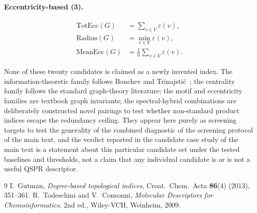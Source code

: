 \documentclass[11pt,a4paper]{article}
\begin{document}
\paragraph{Eccentricity-based (3).}
\begin{align*}
\mathrm{TotEcc}(G) &= \sum_{v \in V} \varepsilon(v), \\
\mathrm{Radius}(G) &= \min_{v \in V} \varepsilon(v), \\
\mathrm{MeanEcc}(G) &= \frac{1}{n}\sum_{v \in V} \varepsilon(v).
\end{align*}

None of these twenty candidates is claimed as a newly invented
index. The information-theoretic family follows Bonchev and
Trinajsti\'c~\cite{Gutman2013Degree, TodeschiniConsonniHandbook};
the centrality family follows the standard graph-theory
literature; the motif and eccentricity families are textbook
graph invariants; the spectral-hybrid combinations are
deliberately constructed novel pairings to test whether
non-standard product indices escape the redundancy ceiling. They
appear here purely as screening targets to test the generality
of the combined diagnostic of the screening protocol of the main text, and the
verdict reported in the candidate case study of the main text is a statement about
this particular candidate set under the tested baselines and
thresholds, not a claim that any individual candidate is or is
not a useful QSPR descriptor.


\begin{thebibliography}{9}\small
{} I.~Gutman, \emph{Degree-based topological indices}, Croat.~Chem.~Acta \textbf{86}(4) (2013), 351--361.
 R.~Todeschini and V.~Consonni, \emph{Molecular Descriptors for Chemoinformatics}, 2nd ed., Wiley-VCH, Weinheim, 2009.
\end{thebibliography}
\end{document}
